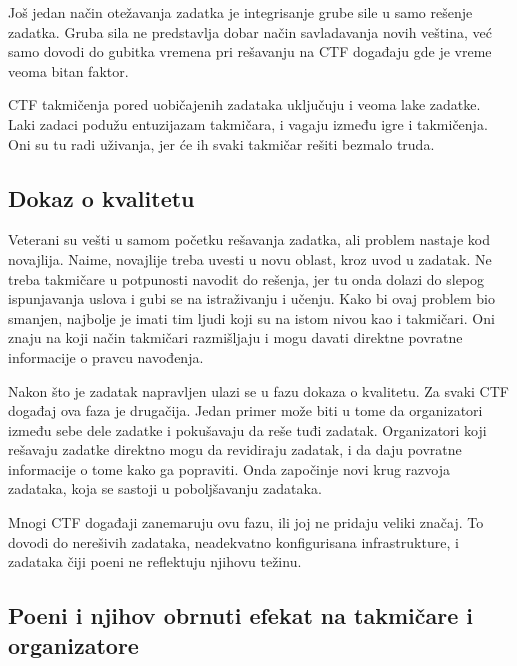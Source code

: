 \documentclass[12pt, a4paper, twocolumn]{article}
\begin{document}
Još jedan način otežavanja zadatka je integrisanje grube sile u samo rešenje
zadatka. Gruba sila ne predstavlja dobar način savladavanja novih veština,
već samo dovodi do gubitka vremena pri rešavanju na CTF događaju gde je 
vreme veoma bitan faktor.

CTF takmičenja pored uobičajenih zadataka uključuju i veoma lake zadatke.
Laki zadaci podužu entuzijazam takmičara, i vagaju između igre i takmičenja. 
Oni su tu radi uživanja, jer će ih svaki takmičar rešiti bezmalo truda.

\subsection{Dokaz o kvalitetu}

Veterani su vešti u samom početku rešavanja zadatka, ali problem nastaje kod 
novajlija. Naime, novajlije treba uvesti u novu oblast, kroz uvod u zadatak. 
Ne treba takmičare u potpunosti navodit do rešenja, jer tu onda dolazi do 
slepog ispunjavanja uslova i gubi se na istraživanju i učenju. Kako bi ovaj 
problem bio smanjen, najbolje je imati tim ljudi koji su na istom nivou kao i 
takmičari. Oni znaju na koji način takmičari razmišljaju i mogu davati 
direktne povratne informacije o pravcu navođenja. 

Nakon što je zadatak napravljen ulazi se u fazu dokaza o kvalitetu. Za
svaki CTF događaj ova faza je drugačija. Jedan primer može biti u tome
da organizatori između sebe dele zadatke i pokušavaju da reše tuđi zadatak.
Organizatori koji rešavaju zadatke direktno mogu da revidiraju zadatak, i
da daju povratne informacije o tome kako ga popraviti. Onda započinje novi
krug razvoja zadataka, koja se sastoji u poboljšavanju zadataka.

Mnogi CTF događaji zanemaruju ovu fazu, ili joj ne pridaju veliki značaj.
To dovodi do nerešivih zadataka, neadekvatno konfigurisana infrastrukture,
i zadataka čiji poeni ne reflektuju njihovu težinu.

\subsection{Poeni i njihov obrnuti efekat na takmičare i organizatore}
\end{document}
